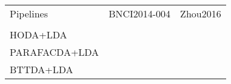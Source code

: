 \begin{tabular}{@{}lcc@{}}
\toprule
      Pipelines &           BNCI2014-004 & Zhou2016 \\
                &                         & \\
\midrule
       HODA+LDA &         &                         \\
  PARAFACDA+LDA &          &                        \\
      BTTDA+LDA &  &                         \\
\bottomrule
\end{tabular}
